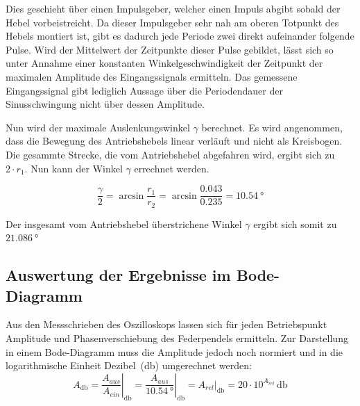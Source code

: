 \documentclass[a4paper,12pt]{scrartcl}
\begin{document}
Dies geschieht über einen Impulsgeber, welcher einen Impuls abgibt sobald der Hebel vorbeistreicht.
Da dieser Impulsgeber sehr nah am oberen Totpunkt des Hebels montiert ist, gibt es dadurch jede Periode zwei direkt aufeinander folgende Pulse.
Wird der Mittelwert der Zeitpunkte dieser Pulse gebildet, lässt sich so unter Annahme einer konstanten Winkelgeschwindigkeit der Zeitpunkt der maximalen Amplitude des Eingangssignals ermitteln.
Das gemessene Eingangssignal gibt lediglich Aussage über die Periodendauer der Sinusschwingung nicht über dessen Amplitude.

Nun wird der maximale Auslenkungswinkel $\gamma$ berechnet. Es wird angenommen, dass die Bewegung des Antriebshebels linear verläuft und nicht als Kreisbogen.
Die gesammte Strecke, die vom Antriebshebel abgefahren wird, ergibt sich zu $2 \cdot r_1$. Nun kann der Winkel $\gamma$ errechnet werden.

\begin{equation}
	\frac{\gamma}{2} = \arcsin{\frac{r_1}{r_2}} = \arcsin{\frac{0.043}{0.235}} =  \SI{10.54}{\degree}
\end{equation}

Der insgesamt vom Antriebshebel überstrichene Winkel $\gamma$ ergibt sich somit zu $\SI{21.086}{\degree}$


\subsection{Auswertung der Ergebnisse im Bode-Diagramm}

Aus den Messschrieben des Oszilloskops lassen sich für jeden Betriebspunkt Amplitude und Phasenverschiebung des Federpendels ermitteln.
Zur Darstellung in einem Bode-Diagramm muss die Amplitude jedoch noch normiert und in die logarithmische Einheit Dezibel~(\si{\decibel}) umgerechnet werden:
\begin{equation}
	A_{\si{\decibel}} = \left.\frac{A_{aus}}{A_{ein}}\right\rvert_{\si{\decibel}}
		= \left.\frac{A_{aus}}{\SI{10.54}{\degree}}\right\rvert_{\si{\decibel}}
		= \left.A_{rel}\right\rvert_{\si{\decibel}}
		= 20 \cdot 10^{A_{rel}} \, \si{\decibel}
\end{equation}
\end{document}

